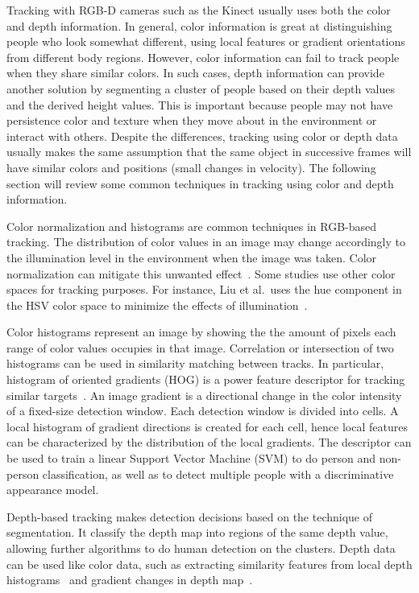 Tracking with RGB-D cameras such as the Kinect usually uses both the color and depth information. In general, color information is great at distinguishing people who look somewhat different, using local features or gradient orientations from different body regions. However, color information can fail to track people when they share similar colors. In such cases, depth information can provide another solution by segmenting a cluster of people based on their depth values and the derived height values. This is important because people may not have persistence color and texture when they move about in the environment or interact with others. Despite the differences, tracking using color or depth data usually makes the same assumption that the same object in successive frames will have similar colors and positions (small changes in velocity). The following section will review some common techniques in tracking using color and depth information.

Color normalization and histograms are common techniques in RGB-based tracking. The distribution of color values in an image may change accordingly to the illumination level in the environment when the image was taken. Color normalization can mitigate this unwanted effect~\cite{reinhard_color_transfers}. Some studies use other color spaces for tracking purposes. For instance, Liu et al.\ uses the hue component in the HSV color space to minimize the effects of illumination~\cite{liu_tracking_with_pei}.

Color histograms represent an image by showing the the amount of pixels each range of color values occupies in that image. Correlation or intersection of two histograms can be used in similarity matching between tracks. In particular, histogram of oriented gradients (HOG) is a power feature descriptor for tracking similar targets~\cite{dalal_hog, dollar_pedestrian_detection, munaro_tracking_within_groups_with_mobile_robot, luber_rgbd_boosted_models}. An image gradient is a directional change in the color intensity of a fixed-size detection window. Each detection window is divided into cells. A local histogram of gradient directions is created for each cell, hence local features can be characterized by the distribution of the local gradients. The descriptor can be used to train a linear Support Vector Machine (SVM) to do person and non-person classification, as well as to detect multiple people with a discriminative appearance model.

Depth-based tracking makes detection decisions based on the technique of segmentation. It classify the depth map into regions of the same depth value, allowing further algorithms to do human detection on the clusters. Depth data can be used like color data, such as extracting similarity features from local depth histograms~\cite{ikemura_depth_simialrity_features} and gradient changes in depth map~\cite{spinello_depth_gradients}.

